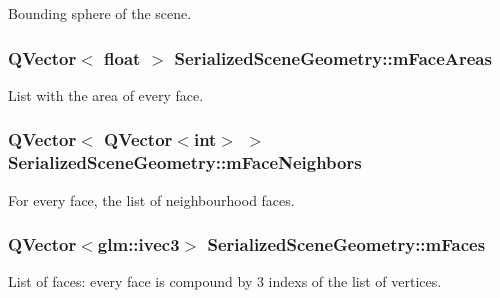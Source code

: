 Bounding sphere of the scene. 

\hypertarget{class_serialized_scene_geometry_a9cd3ce317c637e78e40e000153666b04}{
\subsubsection[{m\+Face\+Areas}]{\setlength{\rightskip}{0pt plus 5cm}Q\+Vector$<$ float $>$ Serialized\+Scene\+Geometry\+::m\+Face\+Areas\hspace{0.3cm}{\ttfamily [private]}}}\label{class_serialized_scene_geometry_a9cd3ce317c637e78e40e000153666b04}


List with the area of every face. 

\hypertarget{class_serialized_scene_geometry_afc874eba53475c29a8895b8c1cece867}{
\subsubsection[{m\+Face\+Neighbors}]{\setlength{\rightskip}{0pt plus 5cm}Q\+Vector$<$ Q\+Vector$<$int$>$ $>$ Serialized\+Scene\+Geometry\+::m\+Face\+Neighbors\hspace{0.3cm}{\ttfamily [private]}}}\label{class_serialized_scene_geometry_afc874eba53475c29a8895b8c1cece867}


For every face, the list of neighbourhood faces. 

\hypertarget{class_serialized_scene_geometry_a9de02e07c46f0638cbae956657c2a3e6}{
\subsubsection[{m\+Faces}]{\setlength{\rightskip}{0pt plus 5cm}Q\+Vector$<$glm\+::ivec3$>$ Serialized\+Scene\+Geometry\+::m\+Faces\hspace{0.3cm}{\ttfamily [private]}}}\label{class_serialized_scene_geometry_a9de02e07c46f0638cbae956657c2a3e6}


List of faces\+: every face is compound by 3 indexs of the list of vertices. 

